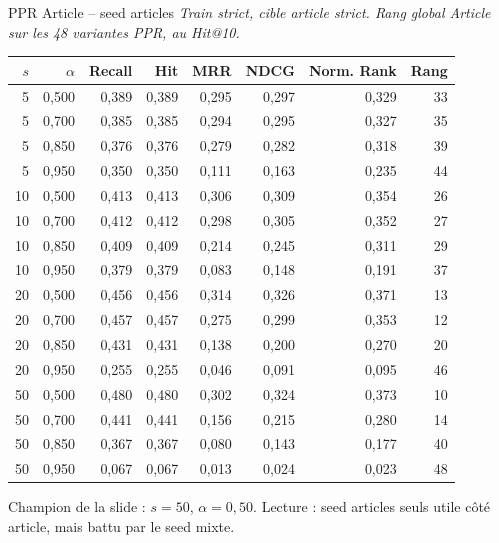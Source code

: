 \documentclass[aspectratio=169,10pt]{beamer}
\newcommand{\keybox}[1]{%
  \begin{center}
  \colorbox{accentsoft}{\parbox{0.92\linewidth}{\centering #1}}
  \end{center}}
\begin{document}
\begin{frame}{PPR Article -- seed articles}
  \tiny
  \textit{Train strict, cible article strict. Rang global Article sur les 48 variantes PPR, au Hit@10.}

  \vspace{0.15em}
  \begin{center}
  \renewcommand{\arraystretch}{0.95}
  \setlength{\tabcolsep}{3pt}
  \begin{tabular}{@{}r r r r r r r r@{}}
    \toprule
    $s$ & $\alpha$ & Recall & Hit & MRR & NDCG & Norm. Rank & Rang \\
    \midrule
    5 & 0,500 & 0,389 & 0,389 & 0,295 & 0,297 & 0,329 & 33 \\
    5 & 0,700 & 0,385 & 0,385 & 0,294 & 0,295 & 0,327 & 35 \\
    5 & 0,850 & 0,376 & 0,376 & 0,279 & 0,282 & 0,318 & 39 \\
    5 & 0,950 & 0,350 & 0,350 & 0,111 & 0,163 & 0,235 & 44 \\
    10 & 0,500 & 0,413 & 0,413 & 0,306 & 0,309 & 0,354 & 26 \\
    10 & 0,700 & 0,412 & 0,412 & 0,298 & 0,305 & 0,352 & 27 \\
    10 & 0,850 & 0,409 & 0,409 & 0,214 & 0,245 & 0,311 & 29 \\
    10 & 0,950 & 0,379 & 0,379 & 0,083 & 0,148 & 0,191 & 37 \\
    20 & 0,500 & 0,456 & 0,456 & 0,314 & 0,326 & 0,371 & 13 \\
    20 & 0,700 & 0,457 & 0,457 & 0,275 & 0,299 & 0,353 & 12 \\
    20 & 0,850 & 0,431 & 0,431 & 0,138 & 0,200 & 0,270 & 20 \\
    20 & 0,950 & 0,255 & 0,255 & 0,046 & 0,091 & 0,095 & 46 \\
    \rowcolor{accentsoft}
    50 & 0,500 & 0,480 & 0,480 & 0,302 & 0,324 & 0,373 & 10 \\
    50 & 0,700 & 0,441 & 0,441 & 0,156 & 0,215 & 0,280 & 14 \\
    50 & 0,850 & 0,367 & 0,367 & 0,080 & 0,143 & 0,177 & 40 \\
    50 & 0,950 & 0,067 & 0,067 & 0,013 & 0,024 & 0,023 & 48 \\
    \bottomrule
  \end{tabular}
  \end{center}

  \vspace{0.2em}
  \keybox{\scriptsize Champion de la slide : $s=50$, $\alpha=0{,}50$.
  Lecture : seed articles seuls utile côté article, mais battu par le seed mixte.}
\end{frame}
\end{document}
